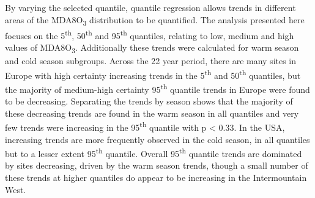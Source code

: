 \documentclass[journal abbreviation, manuscript]{copernicus}
\begin{document}
By varying the selected quantile, quantile regression allows trends in different areas of the MDA8O\textsubscript{3} distribution to be quantified. The analysis presented here focuses on the 5\textsuperscript{th}, 50\textsuperscript{th} and 95\textsuperscript{th} quantiles, relating to low, medium and high values of MDA8O\textsubscript{3}. Additionally these trends were calculated for warm season and cold season subgroups. 
Across the 22 year period, there are many sites in Europe with high certainty increasing trends in the 5\textsuperscript{th} and 50\textsuperscript{th} quantiles, but the majority of medium-high certainty 95\textsuperscript{th} quantile trends in Europe were found to be decreasing. Separating the trends by season shows that the majority of these decreasing trends are found in the warm season in all quantiles and very few trends were increasing in the 95\textsuperscript{th} quantile with p < 0.33. In the USA, increasing trends are more frequently observed in the cold season, in all quantiles but to a lesser extent 95\textsuperscript{th} quantile. Overall 95\textsuperscript{th} quantile trends are dominated by sites decreasing, driven by the warm season trends, though a small number of these trends at higher quantiles do appear to be increasing in the Intermountain West.
\end{document}
